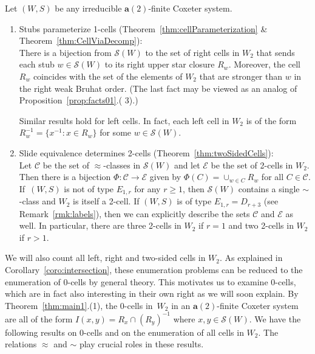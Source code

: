 \documentclass[ALCO,Unicode,published]{cedram}
\newcommand{\la}{\mathbf{a}}
\newcommand{\sw}{\mathcal{S}(W)}
\newcommand{\tul}{\textup{(}}
\newcommand{\tur}{\textup{)}}
\newcommand{\ra}{\rightarrow}
\newcommand{\inverse}{^{-1}}
\begin{document}
\begin{thm}
    \label{thm:main1} Let $(W,S)$ be any irreducible $\la(2)$-finite Coxeter system. 
    \begin{enumerate}
        \item\textup{Stubs parameterize 1-cells (Theorem~\ref{thm:cellParameterization} \&
            Theorem~\ref{thm:CellViaDecomp}):}\\ 
            There is a bijection from $\sw$ to the set of right cells in $W_2$ that sends each stub
            $w\in \sw$ to its right upper star closure $R_w$. Moreover, the cell $R_w$ coincides with
            the set of the elements of $W_2$ that are stronger than $w$ in the right weak Bruhat order.
            \textup{(}The last fact may be viewed as an analog of Proposition~\ref{prop:facts01}.\tul
            3\tur.\textup{)} 

            Similar results hold for left cells. In fact, each left cell in $W_2$ is of the form
            $R_w\inverse=\{x\inverse: x\in R_w\}$ for some $w\in \sw$. 

        \item\textup{Slide equivalence determines 2-cells (Theorem~\ref{thm:twoSidedCells}):}\\ 
            Let $\mathcal{C}$ be the set of $\approx$-classes in $\sw$ and let $\mathcal{E}$ be the set of
            2-cells in $W_2$. Then there is a bijection $\Phi: \mathcal{C}\ra \mathcal{E}$ given by
            $\Phi(C)=\cup_{w\in C}R_w$ for all $C\in \mathcal{C}$. If~$(W,S)$ is not of type $E_{1,r}$ for any
            $r\ge 1$, then $\sw$ contains a single $\sim$-class and $W_2$ is itself a 2-cell. If $(W,S)$ is of
            type $E_{1,r}=D_{r+3}$ (see Remark~\ref{rmk:labels}), then we can explicitly describe the sets
            $\mathcal{C}$ and $\mathcal{E}$ as well. In particular, there are three 2-cells in $W_2$ if $r=1$
            and two 2-cells in $W_2$ if $r>1$.
    \end{enumerate}
\end{thm}

We will also count all left, right and two-sided cells in $W_2$.  As explained in
Corollary~\ref{coro:intersection}, these enumeration problems can be reduced to the enumeration of 0-cells by
general theory. This motivates us to examine 0-cells, which are in fact also interesting in their
own right as we will soon explain.  By Theorem~\ref{thm:main1}.(1), the 0-cells in~$W_2$ in an
$\la(2)$-finite Coxeter system are all of the form $I(x,y)=R_x\cap (R_y)\inverse$ where $x,y\in
\sw$. We have the following results on 0-cells and on the enumeration of all cells in $W_2$. The
relations $\approx$ and $\sim$ play crucial roles in these results.
\end{document}
